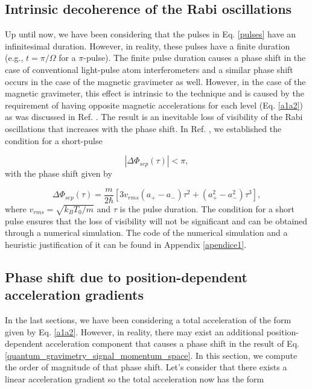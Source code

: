 \documentclass{article}
\begin{document}
\subsection{Intrinsic decoherence of the Rabi oscillations}
Up until now, we have been considering that the pulses in Eq. \ref{pulses} have an infinitesimal duration. However, in reality, these pulses have a finite duration (e.g., $t=\pi/\Omega$ for a $\pi$-pulse). The finite pulse duration causes a phase shift in the case of conventional light-pulse atom interferometers \cite{bertoldi2019nonquadratic} and a similar phase shift occurs in the case of the magnetic gravimeter as well. However, in the case of the magnetic gravimeter, this effect is intrinsic to the technique and is caused by the requirement of having opposite magnetic accelerations for each level (Eq. \ref{a1a2}) as was discussed in Ref. \cite{edgarMagneticGravimeter}. The result is an inevitable loss of visibility of the Rabi oscillations that increases with the phase shift. In Ref. \cite{edgarMagneticGravimeter}, we established the condition for a short-pulse

\begin{equation}
\label{condpower} 
| \Delta \Phi_{sep} (\tau) | < \pi,
\end{equation}
%
with the phase shift given by

\begin{equation}
\label{phaseshiftpos}
\Delta \Phi_{sep} (\tau) = \frac{m}{2\hbar} \left[ 3 v_{rms} (a_{+}-a_{-}) \tau^2 + (a_{+}^2 - a_{-}^2) \tau^3 \right],
\end{equation}
%
where $v_{rms}=\sqrt{k_B T_0 /m}$ and $\tau$ is the pulse duration. The condition for a short pulse ensures that the loss of visibility will not be significant and can be obtained through a numerical simulation. The code of the numerical simulation and a heuristic justification of it can be found in Appendix \ref{apendice1}.

\subsection{Phase shift due to position-dependent acceleration gradients}
In the last sections, we have been considering a total acceleration of the form given by Eq. \ref{a1a2}. However, in reality, there may exist an additional position-dependent acceleration component that causes a phase shift in the result of Eq. \ref{quantum_gravimetry_signal_momentum_space}. In this section, we compute the order of magnitude of that phase shift. Let's consider that there exists a linear acceleration gradient so the total acceleration now has the form
\end{document}

